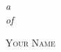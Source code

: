 
\frontmatter
\thispagestyle{empty}

\mbox{}\vspace{2in}
\noindent
\begin{flushright}
{\LARGE\itshape{}a}\\[2\baselineskip]
{\LARGE\itshape{}of}
\end{flushright}

\vspace{6\baselineskip}
\hfill{\Large\scshape{}Your Name}

\cleartorecto\tableofcontents*

\mainmatter


